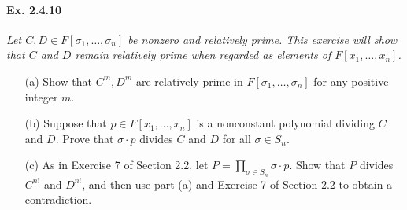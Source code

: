\documentclass[11pt,a4paper]{article}
\begin{document}
\paragraph{Ex. 2.4.10}

{\it Let $C,D \in F[\sigma_1,\ldots,\sigma_n]$ be nonzero and relatively prime. This exercise will show that $C$ and $D$ remain relatively prime when regarded as elements of $F[x_1,\ldots,x_n]$.
\begin{enumerate}
\item[(a)] Show that $C^m,D^m$ are relatively prime in $F[\sigma_1,\ldots,\sigma_n]$ for any positive integer $m$.
\item[(b)] Suppose that $p\in F[x_1,\ldots,x_n]$ is a nonconstant polynomial dividing $C$ and $D$. Prove that $\sigma\cdot p$ divides $C$ and $D$ for all $\sigma \in S_n$.
\item[(c)] As in Exercise 7 of Section 2.2, let $P = \prod_{\sigma \in S_n} \sigma \cdot p$. Show that $P$ divides $C^{n!}$ and $D^{n!}$, and then use part (a) and Exercise 7 of Section 2.2 to obtain a contradiction.
\end{enumerate}
}
\end{document}
